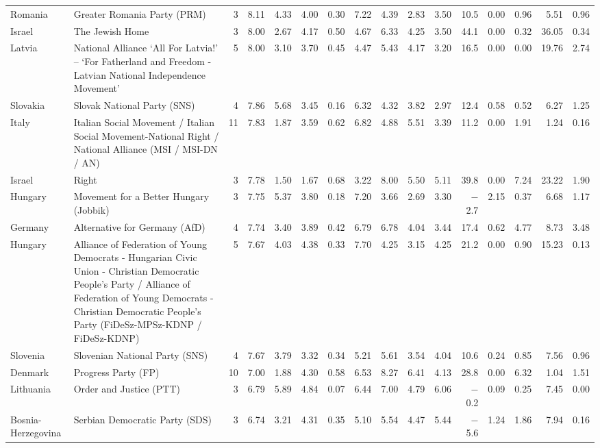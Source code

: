 \begin{table}[ht]
{\begin{tabular}{lp{4.2cm}rrrrrrrrrrrrrr}
Romania & Greater Romania Party (PRM) & 3 & 8.11 & 4.33 & 4.00 & 0.30 & 7.22 & 4.39 & 2.83 & 3.50 & 10.5 & 0.00 & 0.96 & 5.51 & 0.96 \\
Israel & The Jewish Home & 3 & 8.00 & 2.67 & 4.17 & 0.50 & 4.67 & 6.33 & 4.25 & 3.50 & 44.1 & 0.00 & 0.32 & 36.05 & 0.34 \\
Latvia & National Alliance ‘All For Latvia!' – ‘For Fatherland and Freedom - Latvian National Independence Movement' & 5 & 8.00 & 3.10 & 3.70 & 0.45 & 4.47 & 5.43 & 4.17 & 3.20 & 16.5 & 0.00 & 0.00 & 19.76 & 2.74 \\
Slovakia & Slovak National Party (SNS) & 4 & 7.86 & 5.68 & 3.45 & 0.16 & 6.32 & 4.32 & 3.82 & 2.97 & 12.4 & 0.58 & 0.52 & 6.27 & 1.25 \\
Italy & Italian Social Movement / Italian Social Movement-National Right / National Alliance (MSI / MSI-DN / AN) & 11 & 7.83 & 1.87 & 3.59 & 0.62 & 6.82 & 4.88 & 5.51 & 3.39 & 11.2 & 0.00 & 1.91 & 1.24 & 0.16 \\
Israel & Right & 3 & 7.78 & 1.50 & 1.67 & 0.68 & 3.22 & 8.00 & 5.50 & 5.11 & 39.8 & 0.00 & 7.24 & 23.22 & 1.90 \\
Hungary & Movement for a Better Hungary (Jobbik) & 3 & 7.75 & 5.37 & 3.80 & 0.18 & 7.20 & 3.66 & 2.69 & 3.30 & $-$2.7 & 2.15 & 0.37 & 6.68 & 1.17 \\
Germany & Alternative for Germany (AfD) & 4 & 7.74 & 3.40 & 3.89 & 0.42 & 6.79 & 6.78 & 4.04 & 3.44 & 17.4 & 0.62 & 4.77 & 8.73 & 3.48 \\
Hungary & Alliance of Federation of Young Democrats - Hungarian Civic Union - Christian Democratic People's Party / Alliance of Federation of Young Democrats - Christian Democratic People's Party (FiDeSz-MPSz-KDNP / FiDeSz-KDNP) & 5 & 7.67 & 4.03 & 4.38 & 0.33 & 7.70 & 4.25 & 3.15 & 4.25 & 21.2 & 0.00 & 0.90 & 15.23 & 0.13 \\
Slovenia & Slovenian National Party (SNS) & 4 & 7.67 & 3.79 & 3.32 & 0.34 & 5.21 & 5.61 & 3.54 & 4.04 & 10.6 & 0.24 & 0.85 & 7.56 & 0.96 \\
Denmark & Progress Party (FP) & 10 & 7.00 & 1.88 & 4.30 & 0.58 & 6.53 & 8.27 & 6.41 & 4.13 & 28.8 & 0.00 & 6.32 & 1.04 & 1.51 \\
Lithuania & Order and Justice (PTT) & 3 & 6.79 & 5.89 & 4.84 & 0.07 & 6.44 & 7.00 & 4.79 & 6.06 & $-$0.2 & 0.09 & 0.25 & 7.45 & 0.00 \\
Bosnia-Herzegovina & Serbian Democratic Party (SDS) & 3 & 6.74 & 3.21 & 4.31 & 0.35 & 5.10 & 5.54 & 4.47 & 5.44 & $-$5.6 & 1.24 & 1.86 & 7.94 & 0.16 \\

\end{tabular}}
\end{table}
